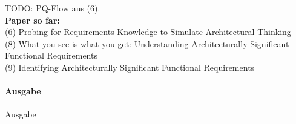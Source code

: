 TODO: PQ-Flow aus (6). \\


\textbf{Paper so far:} \\
(6) Probing for Requirements Knowledge to Simulate Architectural Thinking \\
(8) What you see is what you get: Understanding Architecturally Significant Functional Requirements \\
(9) Identifying Architecturally Significant Functional Requirements \\


\paragraph{Ausgabe}

Ausgabe
